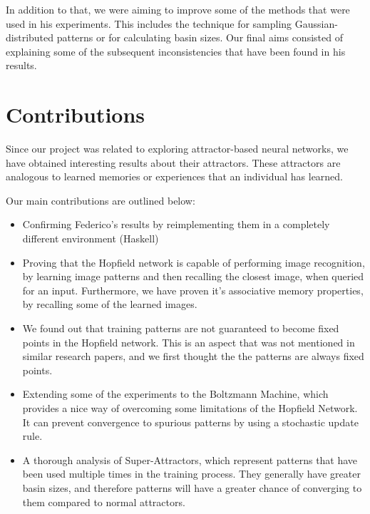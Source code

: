 In addition to that, we were aiming to improve some of the methods that were used in his experiments. This includes the technique for sampling Gaussian-distributed patterns or for calculating basin sizes. Our final aims consisted of explaining some of the subsequent inconsistencies that have been found in his results.

\section{Contributions}

Since our project was related to exploring attractor-based neural networks, we have obtained interesting results about their attractors. These attractors are analogous to learned memories or experiences that an individual has learned.


Our main contributions are outlined below:
\begin{itemize}
\item Confirming Federico's results by reimplementing them in a completely different environment (Haskell)
\item Proving that the Hopfield network is capable of performing image recognition, by learning image patterns and then recalling the closest image, when queried for an input. Furthermore, we have proven it's associative memory properties, by recalling some of the learned images.
\item We found out that training patterns are not guaranteed to become fixed points in the Hopfield network. This is an aspect that was not mentioned in similar research papers, and we first thought the the patterns are always fixed points.
\item Extending some of the experiments to the Boltzmann Machine, which provides a nice way of overcoming some limitations of the Hopfield Network. It can prevent convergence to spurious patterns by using a stochastic update rule.
\item A thorough analysis of Super-Attractors, which represent patterns that have been used multiple times in the training process. They generally have greater basin sizes, and therefore patterns will have a greater chance of converging to them compared to normal attractors.
\end{itemize}
